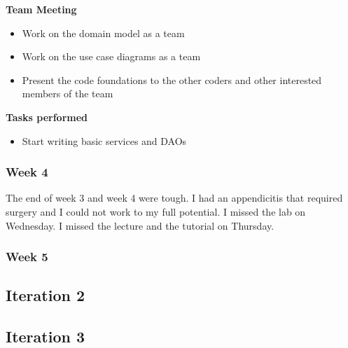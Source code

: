 \documentclass[11pt]{article}
\begin{document}
\textbf{Team Meeting}
\begin{itemize}
    \item Work on the domain model as a team
    \item Work on the use case diagrams as a team
    \item Present the code foundations to the other coders and other interested members of the team
\end{itemize}

\textbf{Tasks performed}
\begin{itemize}
    \item Start writing basic services and DAOs
\end{itemize}

\subsubsection{Week 4}
The end of week 3 and week 4 were tough.
I had an appendicitis that required surgery and I could not work to my full potential.
I missed the lab on Wednesday.
I missed the lecture and the tutorial on Thursday.

\subsubsection{Week 5}


\subsection{Iteration 2}

\subsection{Iteration 3}
\end{document}
